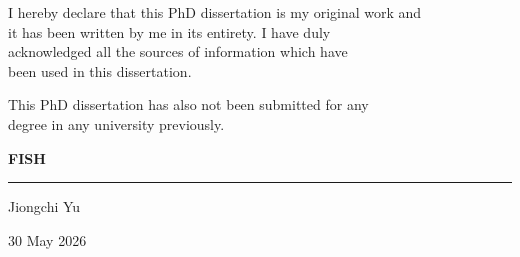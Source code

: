 \documentclass[titlepage,a4paper,12pt,thmsb]{report}
\begin{document}

\begin{titlepage}
\thispagestyle{empty}

\begin{center}

\vspace*{3cm}

\begin{minipage}{0.9\textwidth}
\centering
I hereby declare that this PhD dissertation is my original work and \\ it has been written by me in its entirety. I have duly \\ acknowledged all the sources of information which have \\ been used in this dissertation.

\vspace{1.5cm}

This PhD dissertation has also not been submitted for any \\ degree in any university previously.
\end{minipage}

\vspace{2cm}

\textbf{FISH}

\vspace{-1cm}
\rule{8cm}{0.4pt}

\vspace{0.5cm}

Jiongchi Yu \\

\vspace{0.3cm}

30 May 2026

\end{center}

\end{titlepage}
\newpage

\begin{titlepage}
\thispagestyle{empty}

\end{titlepage}
\newpage
\end{document}
